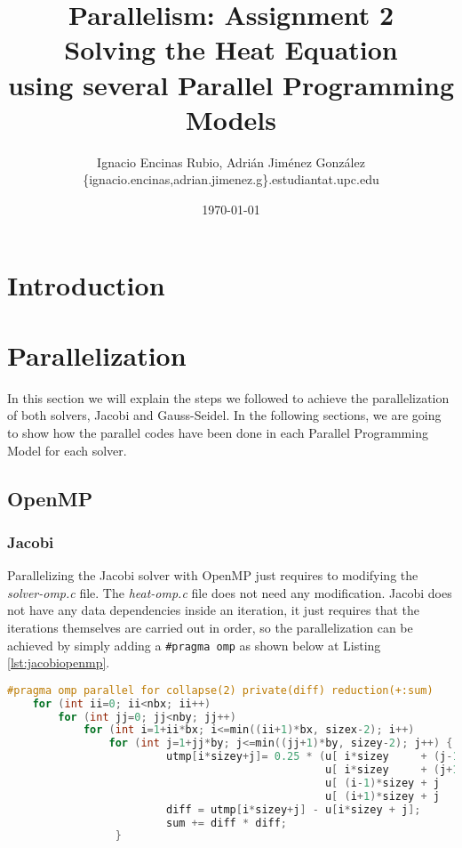 \documentclass[a4paper, 10pt]{article}
\title{\textbf{Parallelism: Assignment 2\\Solving the Heat Equation \\using several Parallel Programming Models}}
\author{Ignacio Encinas Rubio, Adrián Jiménez González\\\{ignacio.encinas,adrian.jimenez.g\}.estudiantat.upc.edu}
\date{\normalsize\today{}}
\begin{document}
\maketitle

  
  

\section{Introduction}

\section{Parallelization}

In this section we will explain the steps we followed to achieve the parallelization of both solvers, Jacobi and Gauss-Seidel. In the following sections, we are going to show how the parallel codes have been done in each Parallel Programming Model for each solver.

\subsection{OpenMP}


\subsubsection{Jacobi}

  Parallelizing the Jacobi solver with OpenMP just requires to modifying the \textit{solver-omp.c} file. The \textit{heat-omp.c} file does not need any modification. 
Jacobi does not have any data dependencies inside an iteration, it just requires that the iterations themselves are carried out in order, so the parallelization can be achieved by simply adding a \texttt{\#pragma omp} as shown below at Listing \ref{lst:jacobiopenmp}.

\begin{lstlisting}[language=c, caption={OpenMP pragma for Jacobi parallelization}, label={lst:jacobiopenmp}]
    #pragma omp parallel for collapse(2) private(diff) reduction(+:sum)
    for (int ii=0; ii<nbx; ii++)
        for (int jj=0; jj<nby; jj++) 
            for (int i=1+ii*bx; i<=min((ii+1)*bx, sizex-2); i++) 
                for (int j=1+jj*by; j<=min((jj+1)*by, sizey-2); j++) {
                         utmp[i*sizey+j]= 0.25 * (u[ i*sizey     + (j-1) ]+  // left
                                                  u[ i*sizey     + (j+1) ]+  // right
                                                  u[ (i-1)*sizey + j     ]+  // top
                                                  u[ (i+1)*sizey + j     ]); // bottom
                         diff = utmp[i*sizey+j] - u[i*sizey + j];
                         sum += diff * diff; 
                 }
\end{lstlisting}
\end{document}
